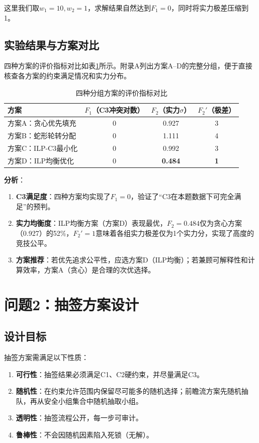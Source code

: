\documentclass[12pt,a4paper]{article}
\begin{document}
这里我们取$w_1=10,w_2=1$，求解结果自然达到$F_1=0$，同时将实力极差压缩到1。

\subsection{实验结果与方案对比}

四种方案的评价指标对比如表\ref{tab:q1_comparison}所示。附录A列出方案A--D的完整分组，便于直接核查各方案的约束满足情况和实力分布。

\begin{table}[H]
  \centering
  \caption{四种分组方案的评价指标对比}
  \label{tab:q1_comparison}
  \small
  \begin{tabular}{lccc}
    \toprule
    方案 & $F_1$（C3冲突对数） & $F_2$（实力$\sigma$） & $F_2'$（极差） \\
    \midrule
    方案A：贪心优先填充 & 0 & 0.927 & 3 \\
    方案B：蛇形轮转分配 & 0 & 1.111 & 4 \\
    方案C：ILP-C3最小化 & 0 & 0.992 & 3 \\
    方案D：ILP均衡优化 & 0 & \textbf{0.484} & \textbf{1} \\
    \bottomrule
  \end{tabular}
\end{table}

\textbf{分析}：

\begin{enumerate}[(1)]
  \item \textbf{C3满足度}：四种方案均实现了$F_1=0$，验证了“C3在本题数据下可完全满足”的预判。
  \item \textbf{实力均衡度}：ILP均衡方案（方案D）表现最优，$F_2=0.484$仅为贪心方案（0.927）的52\%，$F_2'=1$意味着各组实力极差仅为1个实力分，实现了高度的竞技公平。
  \item \textbf{方案推荐}：若优先追求公平性，应选方案D（ILP均衡）；若兼顾可解释性和计算效率，方案A（贪心）是合理的次优选择。
\end{enumerate}

\section{问题2：抽签方案设计}

\subsection{设计目标}

抽签方案需满足以下性质：
\begin{enumerate}[(1)]
  \item \textbf{可行性}：抽签结果必须满足C1、C2硬约束，并尽量满足C3。
  \item \textbf{随机性}：在约束允许范围内保留尽可能多的随机选择；前瞻流方案先随机抽队，再从安全小组集合中随机抽取小组。
  \item \textbf{透明性}：抽签流程公开，每一步可审计。
  \item \textbf{鲁棒性}：不会因随机因素陷入死锁（无解）。
\end{enumerate}
\end{document}
